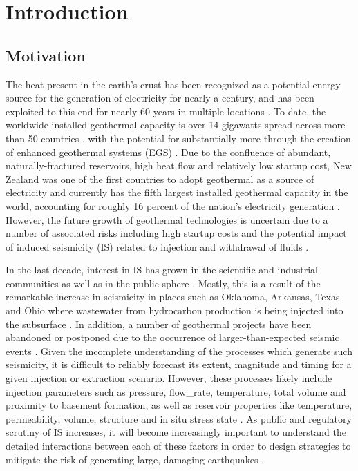 \chapter{Introduction}
\section{Motivation}
The heat present in the earth's crust has been recognized as a potential energy source for the generation of electricity for nearly a century, and has been exploited to this end for nearly 60 years in multiple locations \citep{Gregg_1958,GARRISON_1972,Minissale_1991}. To date, the worldwide installed geothermal capacity is over 14 gigawatts spread across more than 50 countries \citep{Pan_2019, Bertani_2016}, with the potential for substantially more through the creation of enhanced geothermal systems (EGS) \citep{Blackwell_2007}. Due to the confluence of abundant, naturally-fractured reservoirs, high heat flow and relatively low startup cost, New Zealand was one of the first countries to adopt geothermal as a source of electricity and currently has the fifth largest installed geothermal capacity in the world, accounting for roughly 16 percent of the nation's electricity generation \citep{Bertani_2016,Grant_2011}. However, the future growth of geothermal technologies is uncertain due to a number of associated risks including high startup costs \citep{Olasolo_2016} and the potential impact of induced seismicity (IS) related to injection and withdrawal of fluids \citep{Majer_2007,Ellsworth_2013}.

In the last decade, interest in IS has grown in the scientific and industrial communities as well as in the public sphere \citep{Ellsworth_2013}. Mostly, this is a result of the remarkable increase in seismicity in places such as Oklahoma, Arkansas, Texas and Ohio where wastewater from hydrocarbon production is being injected into the subsurface \citep[e.g.][]{Yeck_2017,Horton_2012,Kim_2013,McGarr_2017,Keranen_2013}. In addition, a number of geothermal projects have been abandoned or postponed due to the occurrence of larger-than-expected seismic events \citep[e.g.][]{Deichmann_2009,Grigoli_2018}. Given the incomplete understanding of the processes which generate such seismicity, it is difficult to reliably forecast its extent, magnitude and timing for a given injection or extraction scenario. However, these processes likely include injection parameters such as pressure, \gls{flow_rate}, temperature, total volume and proximity to basement formation, as well as reservoir properties like temperature, \gls{permeability}, volume, structure and in situ stress state \citep{Segall_1998,Bachmann_2012,Ellsworth_2013,mcgarr2014maximum,Jeanne_2015tensor,Goebel_2018}. As public and regulatory scrutiny of IS increases, it will become increasingly important to understand the detailed interactions between each of these factors in order to design strategies to mitigate the risk of generating large, damaging earthquakes \citep[e.g.][]{Langenbruch_2017}.

